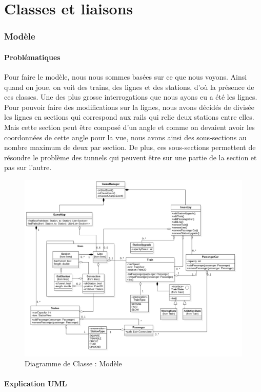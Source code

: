 \documentclass[report, backcover, french, nodocumentinfo]{upmethodology-document}
\begin{document}
	\chapter{Classes et liaisons}
		\subsection{Modèle}
			\subsubsection{Problématiques}
			\p{}
			Pour faire le modèle, nous nous sommes basées sur ce que nous voyons. Ainsi quand on joue, on voit des trains, des lignes et des stations, d'où la présence de ces classes. Une des plus grosse interrogations que nous ayons eu a été les lignes. Pour pouvoir faire des modifications sur la lignes, nous avons décidés de divisée les lignes en sections qui correspond aux rails qui relie deux stations entre elles. Mais cette section peut être composé d'un angle et comme on devaient avoir les coordonnées de cette angle pour la vue, nous avons ainsi des sous-sections au nombre maximum de deux par section. De plus, ces sous-sections permettent de résoudre le problème des tunnels qui peuvent être sur une partie de la section et pas sur l'autre.
			\begin{figure}[h!]
				\centering
				\includegraphics[width=1\textwidth]{figures/ModelClassDiagram}
				\caption{Diagramme de Classe : Modèle}
				\label{fig:ModelClassDiagram}
			\end{figure}
			\subsubsection{Explication UML}
\end{document}
